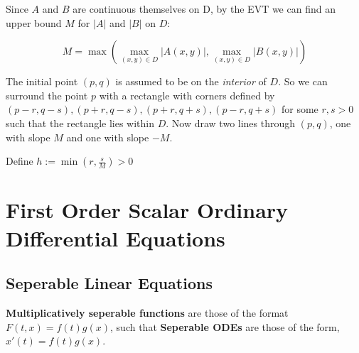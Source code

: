 \documentclass[11 pt, twoside]{article}
\begin{document}
Since $A$ and $B$ are continuous themselves on D, by the EVT we can find an upper bound $M$ for $|A|$ and $|B|$ on $D$:

\[
M = \max(\max_{(x,y) \in D} |A(x, y)|, \max_{(x, y) \in D} |B(x, y)|)
\]

The initial point $(p, q)$ is assumed to be on the \textit{interior} of $D$. So we can surround the point $p$ with a rectangle with corners defined by $(p - r, q - s), (p+r, q - s), (p+r, q+s), (p-r, q+s)$ for some $r, s > 0$ such that the rectangle lies within $D$. Now draw two lines through $(p, q)$, one with slope $M$ and one with slope $-M$.


Define $h := \min(r, \frac{s}{M}) > 0$

\section{First Order Scalar Ordinary Differential Equations}

\subsection{Seperable Linear Equations}
\textbf{Multiplicatively seperable functions} are those of the format $F(t, x) = f(t)g(x)$, such that \textbf{Seperable ODEs} are those of the form, $x'(t) = f(t)g(x)$.
\end{document}
